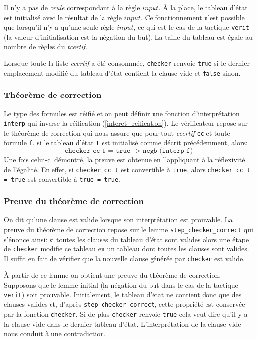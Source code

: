 \documentclass[11pt]{article}
\begin{document}
Il n'y a pas de \textit{crule} correspondant à la règle $input$. À la place, le tableau d'état est initialisé avec le résultat de la règle $input$. Ce fonctionnement n'est possible que lorsqu'il n'y a qu'une seule règle $input$, ce qui est le cas de la tactique \texttt{verit} (la valeur d'initialisation est la négation du but). La taille du tableau est égale au nombre de règles du \textit{tcertif}.\medbreak

Lorsque toute la liste \textit{ccertif} a été consommée, \texttt{checker} renvoie \texttt{true} si le dernier emplacement modifié du tableau d'état contient la clause vide et \texttt{false} sinon.

\subsubsection{Théorème de correction}

Le type des formules est réifié et on peut définir une fonction d'interprétation \texttt{interp} qui inverse la réification (\ref{interet_reification}). Le vérificateur repose sur le théorème de correction qui nous assure que pour tout \textit{ccertif} \texttt{cc} et toute formule \texttt{f}, si le tableau d'état \texttt{t} est initialisé comme décrit précédemment,  alors: 
\[ \texttt{checker cc t = true -> negb (interp f)} \]
 Une fois celui-ci démontré, la preuve est obtenue en l'appliquant à la réflexivité de l'égalité. En effet, si \texttt{checker cc t} est convertible à \texttt{true}, alors \texttt{checker cc t = true} est convertible à \texttt{true = true}.

\subsubsection{Preuve du théorème de correction} \label{preuve_correction}

On dit qu'une clause est valide lorsque son interprétation est prouvable. La preuve du théorème de correction repose sur le lemme \texttt{step\_checker\_correct} qui s'énonce ainsi: si toutes les clauses du tableau d'état sont valides alors une étape de \texttt{checker} modifie ce tableau en un tableau dont toutes les clauses sont valides. Il suffit en fait de vérifier que la nouvelle clause générée par \texttt{checker} est valide. \medbreak

À partir de ce lemme on obtient une preuve du théorème de correction. Supposons que le lemme initial (la négation du but dans le cas de la tactique \texttt{verit}) soit prouvable. Initialement, le tableau d'état ne contient donc que des clauses valides et, d'après \texttt{step\_checker\_correct}, cette propriété est conservée par la fonction \texttt{checker}. Si de plus \texttt{checker} renvoie \texttt{true} cela veut dire qu'il y a la clause vide dans le dernier tableau d'état. L'interprétation de la clause vide nous conduit à une contradiction.
\end{document}
